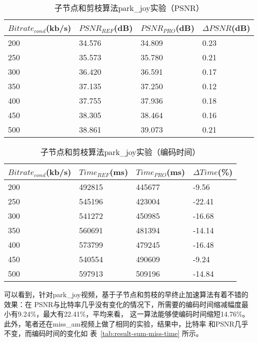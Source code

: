 \begin{table}[H]
  \centering
    \caption{子节点和剪枝算法park\_joy实验（PSNR）}
    \label{tab:result-sum-park-psnr}
    \begin{tabularx}{\linewidth}{XXXX}
      \toprule[1.5pt]
      $Bitrate_{cond}$(kb/s) & $PSNR_{REF}$(dB) & $PSNR_{PRO}$(dB) & $\Delta PSNR$(dB) \\
      \midrule[1pt]
      200 & 34.576 & 34.809 & 0.23  \\
      250 & 35.573 & 35.780 & 0.21 \\
      300 & 36.420 & 36.591 & 0.17  \\
      350 & 37.135 & 37.250 & 0.12 \\
      400 & 37.755 & 37.936 & 0.18  \\
      450 & 38.305 & 38.464 & 0.16 \\
      500 & 38.861 & 39.073 & 0.21  \\
      \bottomrule[1.5pt]
    \end{tabularx}
\end{table}

\begin{table}[H]
  \centering
    \caption{子节点和剪枝算法park\_joy实验（编码时间）}
    \label{tab:result-sum-park-time}
    \begin{tabularx}{\linewidth}{XXXX}
      \toprule[1.5pt]
      $Bitrate_{cond}$(kb/s) & $Time_{REF}$(ms) & $Time_{PRO}$(ms) & $\Delta Time$(\%) \\
      \midrule[1pt]
      200 & 492815 & 445677 & -9.56  \\
      250 & 545196 & 423004 & -22.41 \\
      300 & 541272 & 450985 & -16.68  \\
      350 & 560691 & 481394 & -14.14 \\
      400 & 573799 & 479245 & -16.48  \\
      450 & 540554 & 490609 & -9.24 \\
      500 & 597913 & 509196 & -14.84  \\
      \bottomrule[1.5pt]
    \end{tabularx}
\end{table}


可以看到，针对park\_joy视频，基于子节点和剪枝的早终止加速算法有着不错的效果：在
PSNR与比特率几乎没有变化的情况下，所需要的编码时间缩减幅度最小有9.24\%，最大有22.41\%，平均来看，
这一算法能够使编码时间缩短14.76\%。此外，笔者还在miss\_am视频上做了相同的实验，结果中，比特率
和PSNR几乎不变，而编码时间的变化如 表~\ref{tab:result-sum-miss-time} 所示。

